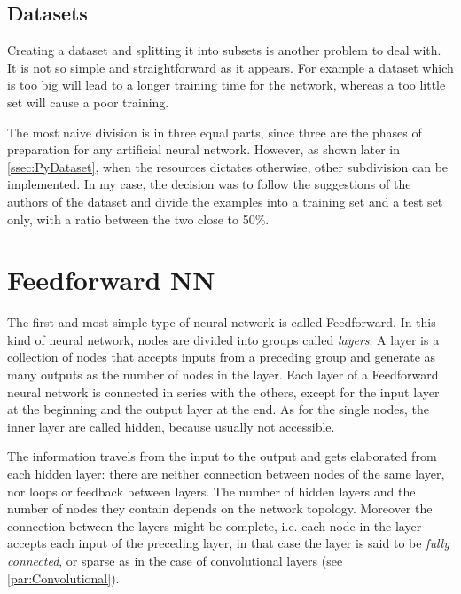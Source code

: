 \subsection{Datasets}
\label{ssec:Datasets}
Creating a dataset and splitting it into subsets is another problem to deal with.
It is not so simple and straightforward as it appears.
For example a dataset which is too big will lead to a longer training time for the network, whereas a too little set will cause a poor training.

The most naive division is in three equal parts, since three are the phases of preparation for any artificial neural network.
However, as shown later in \autoref{ssec:PyDataset}, when the resources dictates otherwise, other subdivision can be implemented.
In my case, the decision was to follow the suggestions of the authors of the dataset and divide the examples into a training set and a test set only, with a ratio between the two close to 50\%.

\section{Feedforward NN}
\label{sec:Feedforward_NN}

The first and most simple type of neural network is called Feedforward.
In this kind of neural network, nodes are divided into groups called \textit{layers}.
A layer is a collection of nodes that accepts inputs from a preceding group and generate as many outputs as the number of nodes in the layer.
Each layer of a Feedforward neural network is connected in series with the others, except for the input layer at the beginning and the output layer at the end.
As for the single nodes, the inner layer are called hidden, because usually not accessible.

The information travels from the input to the output and gets elaborated from each hidden layer: there are neither connection between nodes of the same layer, nor loops or feedback between layers.
The number of hidden layers and the number of nodes they contain depends on the network topology.
Moreover the connection between the layers might be complete, i.e. each node in the layer accepts each input of the preceding layer, in that case the layer is said to be \textit{fully connected}, or sparse as in the case of convolutional layers (see \autoref{par:Convolutional}).

